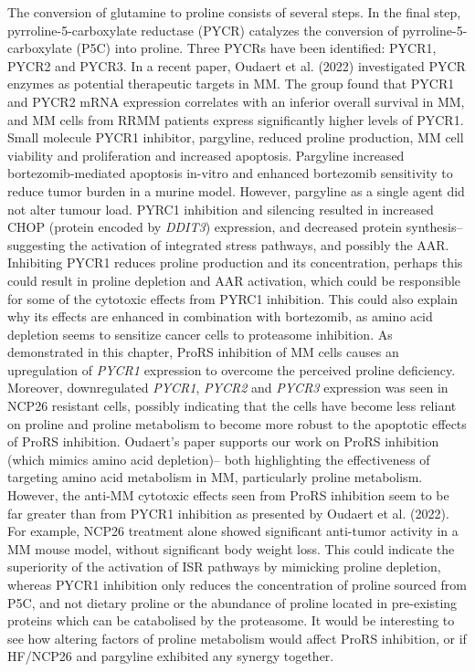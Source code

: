 The conversion of glutamine to proline consists of several steps.
In the final step, pyrroline-5-carboxylate reductase (PYCR) catalyzes the conversion of pyrroline-5-carboxylate (P5C) into proline.
Three PYCRs have been identified: PYCR1, PYCR2 and PYCR3.
In a recent paper, Oudaert et al. (2022) investigated PYCR enzymes as potential therapeutic targets in MM\cite{oudaert2022pyrroline}.
The group found that PYCR1 and PYCR2 mRNA expression correlates with an inferior overall survival in MM, and MM cells from RRMM patients express significantly higher levels of PYCR1\@.
Small molecule PYCR1 inhibitor, pargyline, reduced proline production, MM cell viability and proliferation and increased apoptosis.
Pargyline increased bortezomib-mediated apoptosis in-vitro and enhanced bortezomib sensitivity to reduce tumor burden in a murine model.
However, pargyline as a single agent did not alter tumour load.
PYRC1 inhibition and silencing resulted in increased CHOP (protein encoded by \textit{DDIT3}) expression, and decreased protein synthesis-- suggesting the activation of integrated stress pathways, and possibly the AAR.
Inhibiting PYCR1 reduces proline production and its concentration, perhaps this could result in proline depletion and AAR activation, which could be responsible for some of the cytotoxic effects from PYRC1 inhibition.
This could also explain why its effects are enhanced in combination with bortezomib, as amino acid depletion seems to sensitize cancer cells to proteasome inhibition\cite{mizrachy2010amino}.
As demonstrated in this chapter, ProRS inhibition of MM cells causes an upregulation of \textit{PYCR1} expression to overcome the perceived proline deficiency.
Moreover, downregulated \textit{PYCR1}, \textit{PYCR2} and \textit{PYCR3} expression was seen in NCP26 resistant cells, possibly indicating that the cells have become less reliant on proline and proline metabolism to become more robust to the apoptotic effects of ProRS inhibition.
Oudaert's paper supports our work on ProRS inhibition (which mimics amino acid depletion)-- both highlighting the effectiveness of targeting amino acid metabolism in MM, particularly proline metabolism.
However, the anti-MM cytotoxic effects seen from ProRS inhibition seem to be far greater than from PYCR1 inhibition as presented by Oudaert et al. (2022).
For example, NCP26 treatment alone showed significant anti-tumor activity in a MM mouse model, without significant body weight loss\cite{bottpreclinical2022}.
This could indicate the superiority of the activation of ISR pathways by mimicking proline depletion, whereas PYCR1 inhibition only reduces the concentration of proline sourced from P5C, and not dietary proline or the abundance of proline located in pre-existing proteins which can be catabolised by the proteasome.
It would be interesting to see how altering factors of proline metabolism would affect ProRS inhibition, or if HF/NCP26 and pargyline exhibited any synergy together.


